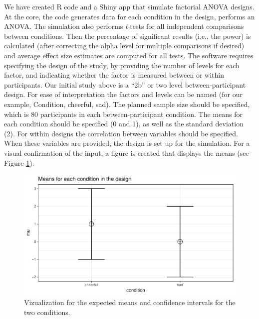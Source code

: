 \documentclass[,jou, draftfirst, a4paper,floatsintext]{apa6}
\begin{document}
We have created R code and a Shiny app that simulate factorial ANOVA designs.
At the core, the code generates data for each condition in the design, performs an ANOVA.
The simulation also performs \emph{t}-tests for all independent comparisons between conditions.
Then the percentage of significant results (i.e., the power) is calculated (after correcting the alpha level for multiple comparisons if desired) and average effect size estimates are computed for all tests.
The software requires specifying the design of the study, by providing the number of levels for each factor, and indicating whether the factor is measured between or within participants. Our initial study above is a \enquote{2b} or two level between-participant design.
For ease of interpretation the factors and levels can be named (for our example, Condition, cheerful, sad).
The planned sample size should be specified, which is 80 participants in each between-participant condition.
The means for each condition should be specified (0 and 1), as well as the standard deviation (2).
For within designs the correlation between variables should be specified.
When these variables are provided, the design is set up for the simulation.
For a visual confirmation of the input, a figure is created that displays the means (see Figure \ref{fig:mean-plot2}).

\begin{figure}
\centering
\includegraphics{0.1_Simulation_Based_Power_Analysis_For_Factorial_ANOVA_Designs_files/figure-latex/mean-plot2-1.pdf}
\caption{\label{fig:mean-plot2}Vizualization for the expected means and confidence intervals for the two conditions.}
\end{figure}
\end{document}
